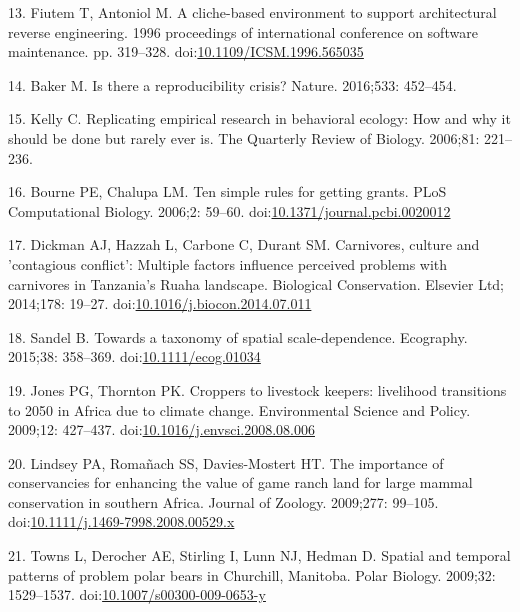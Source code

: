 \documentclass[10pt,letterpaper]{article}
\begin{document}
\hypertarget{ref-Fiutem1996}{}
13. Fiutem T, Antoniol M. A cliche-based environment to support
architectural reverse engineering. 1996 proceedings of international
conference on software maintenance. pp. 319--328.
doi:\href{https://doi.org/10.1109/ICSM.1996.565035}{10.1109/ICSM.1996.565035}

\hypertarget{ref-Baker2016}{}
14. Baker M. Is there a reproducibility crisis? Nature. 2016;533:
452--454.

\hypertarget{ref-Kelly2006}{}
15. Kelly C. Replicating empirical research in behavioral ecology: How
and why it should be done but rarely ever is. The Quarterly Review of
Biology. 2006;81: 221--236.

\hypertarget{ref-Bourne2006}{}
16. Bourne PE, Chalupa LM. Ten simple rules for getting grants. PLoS
Computational Biology. 2006;2: 59--60.
doi:\href{https://doi.org/10.1371/journal.pcbi.0020012}{10.1371/journal.pcbi.0020012}

\hypertarget{ref-Dickman2014}{}
17. Dickman AJ, Hazzah L, Carbone C, Durant SM. Carnivores, culture and
'contagious conflict': Multiple factors influence perceived problems
with carnivores in Tanzania's Ruaha landscape. Biological Conservation.
Elsevier Ltd; 2014;178: 19--27.
doi:\href{https://doi.org/10.1016/j.biocon.2014.07.011}{10.1016/j.biocon.2014.07.011}

\hypertarget{ref-Sandel2015}{}
18. Sandel B. Towards a taxonomy of spatial scale-dependence. Ecography.
2015;38: 358--369.
doi:\href{https://doi.org/10.1111/ecog.01034}{10.1111/ecog.01034}

\hypertarget{ref-Jones2009}{}
19. Jones PG, Thornton PK. Croppers to livestock keepers: livelihood
transitions to 2050 in Africa due to climate change. Environmental
Science and Policy. 2009;12: 427--437.
doi:\href{https://doi.org/10.1016/j.envsci.2008.08.006}{10.1016/j.envsci.2008.08.006}

\hypertarget{ref-Lindsey2009}{}
20. Lindsey PA, Romañach SS, Davies-Mostert HT. The importance of
conservancies for enhancing the value of game ranch land for large
mammal conservation in southern Africa. Journal of Zoology. 2009;277:
99--105.
doi:\href{https://doi.org/10.1111/j.1469-7998.2008.00529.x}{10.1111/j.1469-7998.2008.00529.x}

\hypertarget{ref-Towns2009}{}
21. Towns L, Derocher AE, Stirling I, Lunn NJ, Hedman D. Spatial and
temporal patterns of problem polar bears in Churchill, Manitoba. Polar
Biology. 2009;32: 1529--1537.
doi:\href{https://doi.org/10.1007/s00300-009-0653-y}{10.1007/s00300-009-0653-y}
\end{document}
